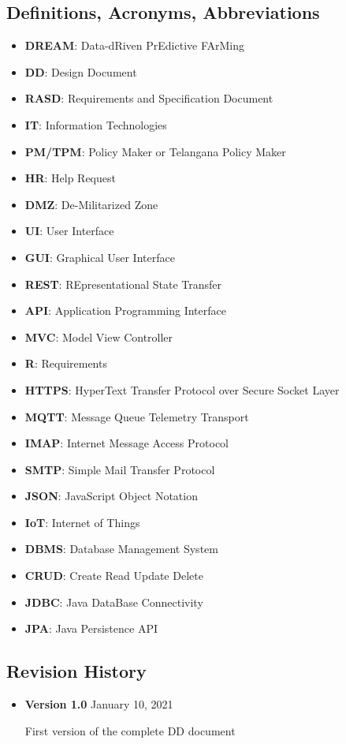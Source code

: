 \documentclass[10pt]{article} %
\begin{document}
\subsection{Definitions, Acronyms, Abbreviations}
\begin{itemize}
    \item \textbf{DREAM}: Data-dRiven PrEdictive FArMing
    \item \textbf{DD}: Design Document
    \item \textbf{RASD}: Requirements and Specification Document
    \item \textbf{IT}: Information Technologies
    \item \textbf{PM/TPM}: Policy Maker or Telangana Policy Maker
    \item \textbf{HR}: Help Request
    \item \textbf{DMZ}: De-Militarized Zone
    \item \textbf{UI}: User Interface
    \item \textbf{GUI}: Graphical User Interface
    \item \textbf{REST}: REpresentational State Transfer
    \item \textbf{API}: Application Programming Interface
    \item \textbf{MVC}: Model View Controller
    \item \textbf{R}: Requirements
    \item \textbf{HTTPS}: HyperText Transfer Protocol over Secure Socket Layer
    \item \textbf{MQTT}: Message Queue Telemetry Transport
    \item \textbf{IMAP}: Internet Message Access Protocol
    \item \textbf{SMTP}: Simple Mail Transfer Protocol
    \item \textbf{JSON}: JavaScript Object Notation
    \item \textbf{IoT}: Internet of Things
    \item \textbf{DBMS}: Database Management System
    \item \textbf{CRUD}: Create Read Update Delete
    \item \textbf{JDBC}: Java DataBase Connectivity
    \item \textbf{JPA}: Java Persistence API
\end{itemize}
\subsection{Revision History}
\begin{itemize}
    \item \textbf{Version 1.0} January 10, 2021
    \begin{itemize}
        First version of the complete DD document
    \end{itemize} 
\end{itemize}
\end{document}
